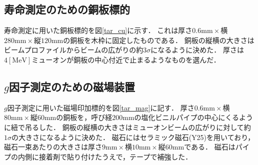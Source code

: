 



%

\subsection{寿命測定のための銅板標的}
寿命測定に用いた銅板標的を図\ref{tar_cu}に示す．
これは厚さ$0.6\mathrm{mm}\times$横$280\mathrm{mm}\times$縦$120\mathrm{mm}$の銅板を木枠に固定したものである．
銅板の縦横の大きさはビームプロファイルからビームの広がりの約$3\sigma$になるように決めた．
厚さは$4[\mathrm{MeV}]$ミューオンが銅板の中心付近で止まるようなものを選んだ．

\subsection{$g$因子測定のための磁場装置}
$g$因子測定に用いた磁場印加標的を図\ref{tar_mag}に記す．
厚さ$0.6\mathrm{mm}\times$横$80\mathrm{mm}\times$縦$60\mathrm{mm}$の銅板を，呼び経$200\mathrm{mm}$の塩化ビニルパイプの中心にくるように紐で吊るした．
銅板の縦横の大きさはミューオンビームの広がりに対して約$1\sigma$の大きさになるように決めた．
磁石にはセラミック磁石(Y25)を用いており，磁石一束あたりの大きさは厚さ$9\mathrm{mm}\times$横$10\mathrm{mm}\times$縦$60\mathrm{mm}$である．
磁石はパイプの内側に接着剤で貼り付けたうえで，テープで補強した．

